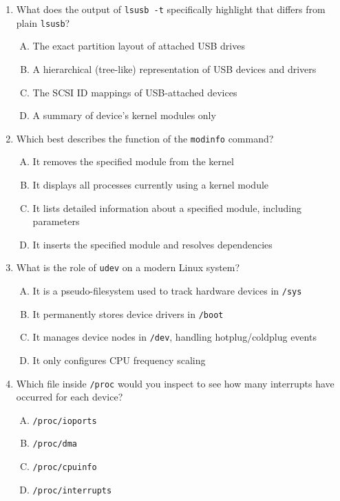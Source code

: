 \documentclass[a4paper]{report}
\begin{document}
\begin{enumerate}[1.]
\item What does the output of \texttt{lsusb -t} specifically highlight that differs from plain \texttt{lsusb}?
  \begin{enumerate}[A)]
    \item The exact partition layout of attached USB drives
    \item A hierarchical (tree-like) representation of USB devices and drivers
    \item The SCSI ID mappings of USB-attached devices
    \item A summary of device’s kernel modules only
  \end{enumerate}

\item Which best describes the function of the \texttt{modinfo} command?
  \begin{enumerate}[A)]
    \item It removes the specified module from the kernel
    \item It displays all processes currently using a kernel module
    \item It lists detailed information about a specified module, including parameters
    \item It inserts the specified module and resolves dependencies
  \end{enumerate}

\item What is the role of \texttt{udev} on a modern Linux system?
  \begin{enumerate}[A)]
    \item It is a pseudo-filesystem used to track hardware devices in \texttt{/sys}
    \item It permanently stores device drivers in \texttt{/boot}
    \item It manages device nodes in \texttt{/dev}, handling hotplug/coldplug events
    \item It only configures CPU frequency scaling
  \end{enumerate}

\item Which file inside \texttt{/proc} would you inspect to see how many interrupts have occurred for each device?
  \begin{enumerate}[A)]
    \item \texttt{/proc/ioports}
    \item \texttt{/proc/dma}
    \item \texttt{/proc/cpuinfo}
    \item \texttt{/proc/interrupts}
  \end{enumerate}


\end{enumerate}
\end{document}
